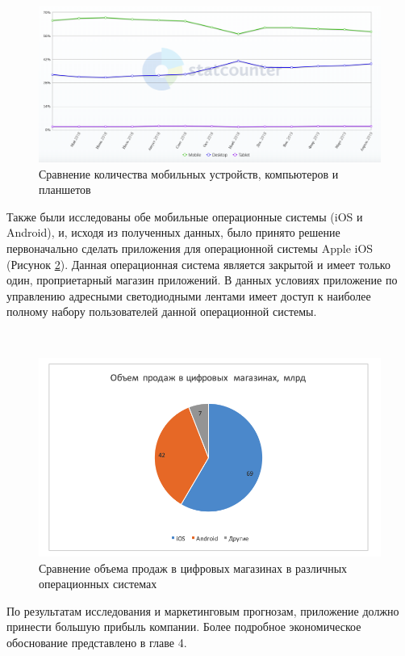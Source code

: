 ~
\begin{figure}[H]
\centering
	\includegraphics[scale=0.4]{figures/deviceMarket.png}
	\caption{Сравнение количества мобильных устройств, компьютеров и планшетов}
	\label{fig:analysis:companyGarlands:deviceMarket}
\end{figure}

Также были исследованы обе мобильные операционные системы (iOS и Android), и, исходя из полученных данных, было принято решение первоначально сделать приложения для операционной системы Apple iOS (Рисунок \ref{fig:analysis:companyGarlands:digitalMarkets}). Данная операционная система является закрытой и имеет только один, проприетарный магазин приложений. В данных условиях приложение по управлению адресными светодиодными лентами имеет доступ к наиболее полному набору пользователей данной операционной системы.

~
\begin{figure}[H]
\centering
	\includegraphics[scale=1]{figures/digitalMarkets.png}
	\caption{Сравнение объема продаж в цифровых магазинах в различных операционных системах}
	\label{fig:analysis:companyGarlands:digitalMarkets}
\end{figure}

По результатам исследования и маркетинговым прогнозам, приложение должно принести большую прибыль компании. Более подробное экономическое обоснование представлено в главе 4.